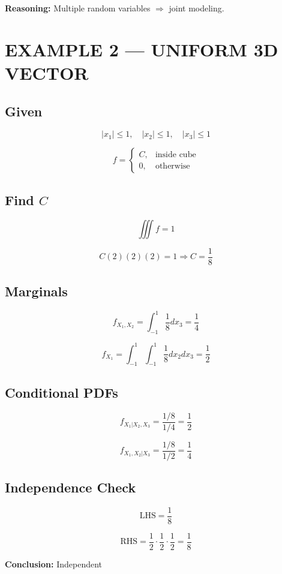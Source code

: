 \documentclass[12pt]{article}
\begin{document}
\textbf{Reasoning:} Multiple random variables $\Rightarrow$ joint modeling.

\section{EXAMPLE 2 — UNIFORM 3D VECTOR}

\subsection*{Given}

\[
|x_1| \le 1, \quad |x_2| \le 1, \quad |x_3| \le 1
\]

\[
f =
\begin{cases}
C, & \text{inside cube} \\
0, & \text{otherwise}
\end{cases}
\]

\subsection*{Find $C$}

\[
\iiint f = 1
\]

\[
C (2)(2)(2) = 1 \Rightarrow C = \frac{1}{8}
\]

\subsection*{Marginals}

\[
f_{X_1,X_2} = \int_{-1}^{1} \frac{1}{8} dx_3 = \frac{1}{4}
\]

\[
f_{X_1} = \int_{-1}^{1} \int_{-1}^{1} \frac{1}{8} dx_2 dx_3 = \frac{1}{2}
\]

\subsection*{Conditional PDFs}

\[
f_{X_1|X_2,X_3} = \frac{1/8}{1/4} = \frac{1}{2}
\]

\[
f_{X_1,X_2|X_3} = \frac{1/8}{1/2} = \frac{1}{4}
\]

\subsection*{Independence Check}

\[
\text{LHS} = \frac{1}{8}
\]

\[
\text{RHS} = \frac{1}{2} \cdot \frac{1}{2} \cdot \frac{1}{2} = \frac{1}{8}
\]

\textbf{Conclusion:} Independent
\end{document}
